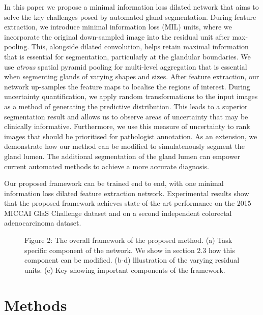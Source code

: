 \documentclass[3p]{elsarticle}
\begin{document}
In this paper we propose a minimal information loss dilated network that aims to solve the key challenges posed by automated gland segmentation. During feature extraction, we introduce minimal information loss (MIL) units, where we incorporate the original down-sampled image into the residual unit after max-pooling. This, alongside dilated convolution, helps retain maximal information that is essential for segmentation, particularly at the glandular boundaries. We use \textit{atrous} spatial pyramid pooling for multi-level aggregation that is essential when segmenting glands of varying shapes and sizes. After feature extraction, our network up-samples the feature maps to localise the regions of interest. During uncertainty quantification, we apply random transformations to the input images as a method of generating the predictive distribution. This leads to a superior segmentation result and allows us to observe areas of uncertainty that may be clinically informative. Furthermore, we use this measure of uncertainty to rank images that should be prioritised for pathologist annotation. As an extension, we demonstrate how our method can be modified to simulatenously segment the gland lumen. The additional segmentation of the gland lumen can empower current automated methods to achieve a more accurate diagnosis. 

Our proposed framework can be trained end to end, with one minimal information loss dilated feature extraction network. Experimental results show that the proposed framework achieves state-of-the-art performance on the 2015 MICCAI GlaS Challenge dataset and on a second independent colorectal adenocarcinoma dataset.

\begin{figure}[!t]
\centering
\captionsetup[subfigure]{labelformat=empty}
\caption*{Figure 2: The overall framework of the proposed method. (a) Task specific component of the network. We show in section 2.3 how this component can be modified. (b-d) lllustration of the varying residual units. (e) Key showing important components of the framework.}
\label{fig:detection}
\end{figure}

\section{Methods}
\end{document}
